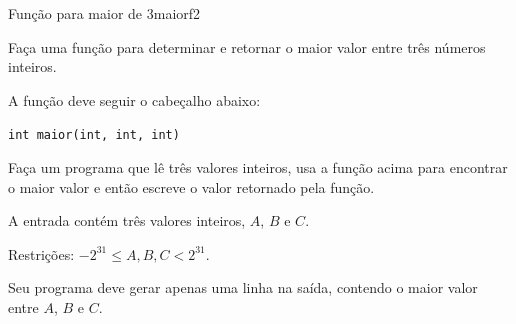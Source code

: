 \documentclass[12pt,a4paper,oneside]{article}
\begin{document}
\begin{problem}{Função para maior de 3}{maiorf}{2}

\begingroup
\setlength{\intextsep}{0pt}%

Faça uma função para determinar e retornar o maior valor entre três números inteiros.

A função deve seguir o cabeçalho abaixo:

\texttt{\textcolor{Mulberry}{int} maior(\textcolor{Mulberry}{int}, \textcolor{Mulberry}{int}, \textcolor{Mulberry}{int})}

Faça um programa que lê três valores inteiros, usa a função acima para encontrar o maior valor e então escreve o valor retornado pela função.


\InputFile

A entrada contém três valores inteiros, $A$, $B$ e $C$.

Restrições: $-2^{31} \leq A,B,C < 2^{31}$.

\endgroup

\OutputFile

Seu programa deve gerar apenas uma linha na saída, contendo o maior valor entre $A$, $B$ e $C$.


\Example

\begin{example}
%
\end{example}

\begin{example}
%
\end{example}

\begin{example}
%
\end{example}

\begin{example}
%
\end{example}


\end{problem}
\end{document}
